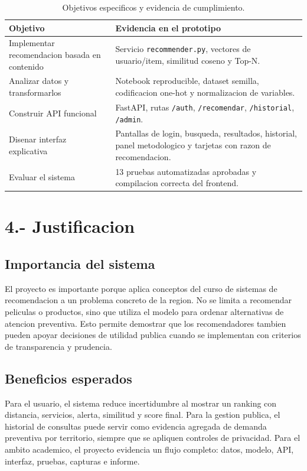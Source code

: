\documentclass[12pt,a4paper]{article}
\begin{document}
\begin{table}[H]
\centering
\caption{Objetivos especificos y evidencia de cumplimiento.}
\label{tab:objetivos}
\small
\begin{tabular}{p{5cm}p{8cm}}
\toprule
Objetivo & Evidencia en el prototipo \\
\midrule
Implementar recomendacion basada en contenido & Servicio \texttt{recommender.py}, vectores de usuario/item, similitud coseno y Top-N. \\
Analizar datos y transformarlos & Notebook reproducible, dataset semilla, codificacion one-hot y normalizacion de variables. \\
Construir API funcional & FastAPI, rutas \texttt{/auth}, \texttt{/recomendar}, \texttt{/historial}, \texttt{/admin}. \\
Disenar interfaz explicativa & Pantallas de login, busqueda, resultados, historial, panel metodologico y tarjetas con razon de recomendacion. \\
Evaluar el sistema & 13 pruebas automatizadas aprobadas y compilacion correcta del frontend. \\
\bottomrule
\end{tabular}
\end{table}

\section{4.- Justificacion}
\subsection{Importancia del sistema}
El proyecto es importante porque aplica conceptos del curso de sistemas de recomendacion a un problema concreto de la region. No se limita a recomendar peliculas o productos, sino que utiliza el modelo para ordenar alternativas de atencion preventiva. Esto permite demostrar que los recomendadores tambien pueden apoyar decisiones de utilidad publica cuando se implementan con criterios de transparencia y prudencia.

\subsection{Beneficios esperados}
Para el usuario, el sistema reduce incertidumbre al mostrar un ranking con distancia, servicios, alerta, similitud y score final. Para la gestion publica, el historial de consultas puede servir como evidencia agregada de demanda preventiva por territorio, siempre que se apliquen controles de privacidad. Para el ambito academico, el proyecto evidencia un flujo completo: datos, modelo, API, interfaz, pruebas, capturas e informe.
\end{document}
